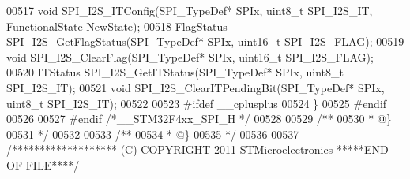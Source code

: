 \begin{DoxyCode}
00517 \textcolor{keywordtype}{void} SPI_I2S_ITConfig(SPI\_TypeDef* SPIx, uint8\_t SPI\_I2S\_IT, FunctionalState NewState);
00518 FlagStatus SPI_I2S_GetFlagStatus(SPI\_TypeDef* SPIx, uint16\_t SPI\_I2S\_FLAG);
00519 \textcolor{keywordtype}{void} SPI_I2S_ClearFlag(SPI\_TypeDef* SPIx, uint16\_t SPI\_I2S\_FLAG);
00520 ITStatus SPI_I2S_GetITStatus(SPI\_TypeDef* SPIx, uint8\_t SPI\_I2S\_IT);
00521 \textcolor{keywordtype}{void} SPI_I2S_ClearITPendingBit(SPI\_TypeDef* SPIx, uint8\_t SPI\_I2S\_IT);
00522 
00523 \textcolor{preprocessor}{#}\textcolor{preprocessor}{ifdef} \_\_cplusplus
00524 \}
00525 \textcolor{preprocessor}{#}\textcolor{preprocessor}{endif}
00526 
00527 \textcolor{preprocessor}{#}\textcolor{preprocessor}{endif} \textcolor{comment}{/*\_\_STM32F4xx\_SPI\_H */}
00528 
00529 \textcolor{comment}{/**}
00530 \textcolor{comment}{  * @\}}
00531 \textcolor{comment}{  */}
00532 
00533 \textcolor{comment}{/**}
00534 \textcolor{comment}{  * @\}}
00535 \textcolor{comment}{  */}
00536 
00537 \textcolor{comment}{/******************* (C) COPYRIGHT 2011 STMicroelectronics *****END OF FILE****/}
\end{DoxyCode}
